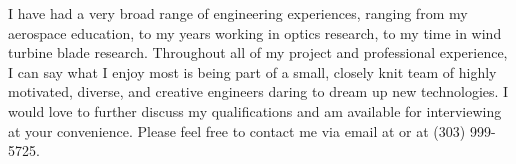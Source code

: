 I have had a very broad range of engineering experiences, ranging from my aerospace education, to my years working in optics research, to my time in wind turbine blade research. Throughout all of my project and professional experience, I can say what I  enjoy most is being part of a small, closely knit team of highly motivated, diverse, and creative engineers daring to dream up new technologies. I would love to further discuss my qualifications and am available for interviewing at your convenience. Please feel free to contact me via email at  or at (303) 999-5725. 